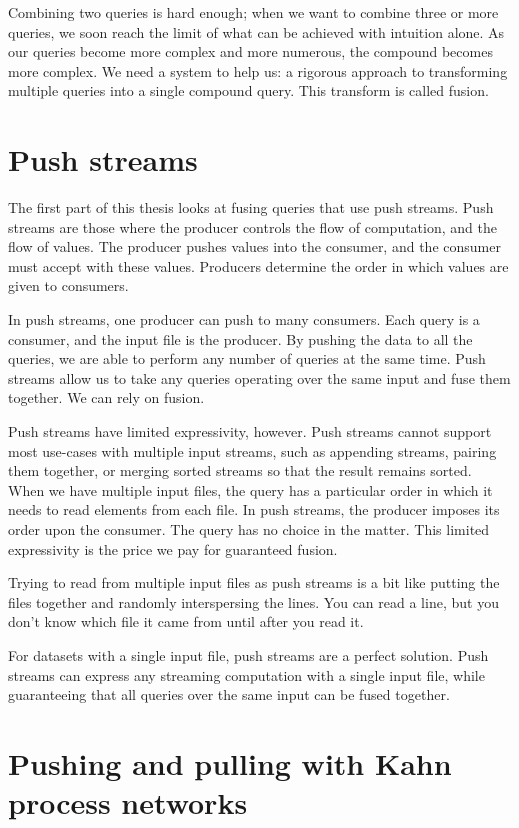 Combining two queries is hard enough; when we want to combine three or more queries, we soon reach the limit of what can be achieved with intuition alone.
As our queries become more complex and more numerous, the compound becomes more complex.
We need a system to help us: a rigorous approach to transforming multiple queries into a single compound query.
This transform is called fusion.

\section{Push streams}

The first part of this thesis looks at fusing queries that use push streams.
Push streams are those where the producer controls the flow of computation, and the flow of values.
The producer pushes values into the consumer, and the consumer must accept with these values.
Producers determine the order in which values are given to consumers.

In push streams, one producer can push to many consumers.
Each query is a consumer, and the input file is the producer.
By pushing the data to all the queries, we are able to perform any number of queries at the same time.
Push streams allow us to take any queries operating over the same input and fuse them together.
We can rely on fusion.

Push streams have limited expressivity, however.
Push streams cannot support most use-cases with multiple input streams, such as appending streams, pairing them together, or merging sorted streams so that the result remains sorted.
When we have multiple input files, the query has a particular order in which it needs to read elements from each file.
In push streams, the producer imposes its order upon the consumer.
The query has no choice in the matter.
This limited expressivity is the price we pay for guaranteed fusion.

Trying to read from multiple input files as push streams is a bit like putting the files together and randomly interspersing the lines.
You can read a line, but you don't know which file it came from until after you read it.

For datasets with a single input file, push streams are a perfect solution.
Push streams can express any streaming computation with a single input file, while guaranteeing that all queries over the same input can be fused together.

\section{Pushing and pulling with Kahn process networks}

